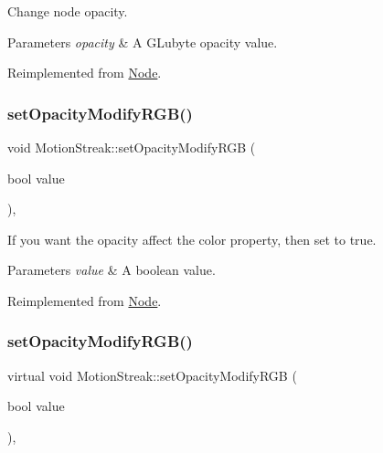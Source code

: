 Change node opacity. 
\begin{DoxyParams}{Parameters}
{\em opacity} & A G\+Lubyte opacity value. \\
\hline
\end{DoxyParams}


Reimplemented from \hyperlink{classNode_ae41a9db63bfa3d466ee7c9d79c35352d}{Node}.

\mbox{\label{classMotionStreak_aa140ca21b82d41fbe8c0ba08d8060c3b}} 
\subsubsection{\texorpdfstring{set\+Opacity\+Modify\+R\+G\+B()}{setOpacityModifyRGB()}\hspace{0.1cm}{\footnotesize\ttfamily [1/2]}}
{\footnotesize\ttfamily void Motion\+Streak\+::set\+Opacity\+Modify\+R\+GB (\begin{DoxyParamCaption}\item[{bool}]{value }\end{DoxyParamCaption})\hspace{0.3cm}{\ttfamily [override]}, {\ttfamily [virtual]}}

If you want the opacity affect the color property, then set to true. 
\begin{DoxyParams}{Parameters}
{\em value} & A boolean value. \\
\hline
\end{DoxyParams}


Reimplemented from \hyperlink{classNode_a978c5435ab23f76e9efdf0f7e9e288e5}{Node}.

\mbox{\label{classMotionStreak_a03e92253595f528d79528bbb4be1b2ad}} 
\subsubsection{\texorpdfstring{set\+Opacity\+Modify\+R\+G\+B()}{setOpacityModifyRGB()}\hspace{0.1cm}{\footnotesize\ttfamily [2/2]}}
{\footnotesize\ttfamily virtual void Motion\+Streak\+::set\+Opacity\+Modify\+R\+GB (\begin{DoxyParamCaption}\item[{bool}]{value }\end{DoxyParamCaption})\hspace{0.3cm}{\ttfamily [override]}, {\ttfamily [virtual]}}

